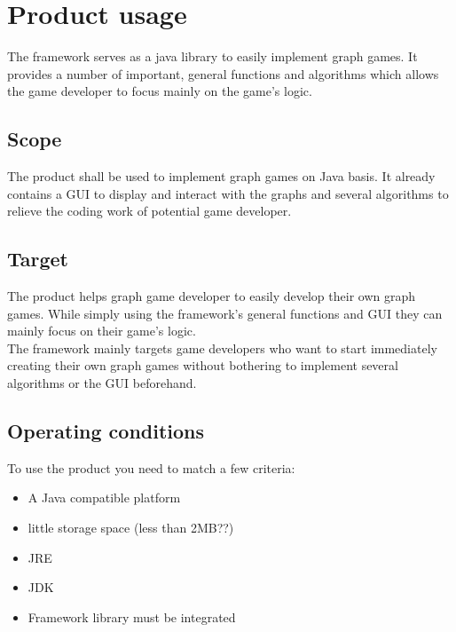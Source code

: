\section{Product usage}
The \gls{framework} serves as a \gls{java} library to easily implement \gls{graph} games. It provides a number of important, general functions and algorithms which allows the game developer to focus mainly on the game's logic.

\subsection{Scope}
The product shall be used to implement graph games on Java basis. It already contains a \gls{GUI} to display and interact with the graphs and several algorithms to relieve the coding work of potential game developer.

\subsection{Target}
The product helps graph game developer to easily develop their own graph games. While simply using the framework's general functions and GUI they can mainly focus on their game's logic. \\
The framework mainly targets game developers who want to start immediately creating their own graph games without bothering to implement several algorithms or the GUI beforehand.

\subsection{Operating conditions}
To use the product you need to match a few criteria:
\begin{itemize}
\item A Java compatible platform
\item little storage space (less than 2MB??)
\item JRE
\item JDK
\item Framework library must be integrated
\end{itemize}